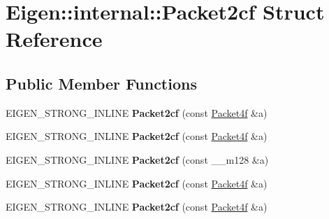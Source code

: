 \hypertarget{struct_eigen_1_1internal_1_1_packet2cf}{}\section{Eigen\+:\+:internal\+:\+:Packet2cf Struct Reference}
\label{struct_eigen_1_1internal_1_1_packet2cf}
\subsection*{Public Member Functions}
\begin{DoxyCompactItemize}
\item 
\mbox{\label{struct_eigen_1_1internal_1_1_packet2cf_aa11922dc62f1730f0ee2ae77e190f9f8}} 
E\+I\+G\+E\+N\+\_\+\+S\+T\+R\+O\+N\+G\+\_\+\+I\+N\+L\+I\+NE {\bfseries Packet2cf} (const \hyperlink{struct_eigen_1_1internal_1_1_packet4f}{Packet4f} \&a)
\item 
\mbox{\label{struct_eigen_1_1internal_1_1_packet2cf_aa11922dc62f1730f0ee2ae77e190f9f8}} 
E\+I\+G\+E\+N\+\_\+\+S\+T\+R\+O\+N\+G\+\_\+\+I\+N\+L\+I\+NE {\bfseries Packet2cf} (const \hyperlink{struct_eigen_1_1internal_1_1_packet4f}{Packet4f} \&a)
\item 
\mbox{\label{struct_eigen_1_1internal_1_1_packet2cf_a4a2b441be6264366ddbad387fa73ff09}} 
E\+I\+G\+E\+N\+\_\+\+S\+T\+R\+O\+N\+G\+\_\+\+I\+N\+L\+I\+NE {\bfseries Packet2cf} (const \+\_\+\+\_\+m128 \&a)
\item 
\mbox{\label{struct_eigen_1_1internal_1_1_packet2cf_aa11922dc62f1730f0ee2ae77e190f9f8}} 
E\+I\+G\+E\+N\+\_\+\+S\+T\+R\+O\+N\+G\+\_\+\+I\+N\+L\+I\+NE {\bfseries Packet2cf} (const \hyperlink{struct_eigen_1_1internal_1_1_packet4f}{Packet4f} \&a)
\item 
\mbox{\label{struct_eigen_1_1internal_1_1_packet2cf_aa11922dc62f1730f0ee2ae77e190f9f8}} 
E\+I\+G\+E\+N\+\_\+\+S\+T\+R\+O\+N\+G\+\_\+\+I\+N\+L\+I\+NE {\bfseries Packet2cf} (const \hyperlink{struct_eigen_1_1internal_1_1_packet4f}{Packet4f} \&a)
\item 
\mbox{\label{struct_eigen_1_1internal_1_1_packet2cf_aa11922dc62f1730f0ee2ae77e190f9f8}} 

\end{DoxyCompactItemize}
